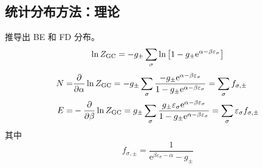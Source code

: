 \subsection{统计分布方法：理论}

\begin{framed}
    推导出 BE 和 FD 分布。\[
        \ln{Z_{\text{GC}}} = - g_{\pm} \sum_{\sigma} \ln \qty[1 - g_{\pm} \mathrm{e}^{\alpha - \beta \varepsilon_{\sigma}}]
    \] \begin{align*}
        N = & \pdv{\alpha} \ln{Z_{\text{GC}}} = - g_{\pm} \sum_{\sigma} \frac{- g_{\pm} \mathrm{e}^{\alpha - \beta \varepsilon_{\sigma}}}{1 - g_{\pm} \mathrm{e}^{\alpha - \beta \varepsilon_{\sigma}}} = \sum_{\sigma} f_{\sigma, \pm}                                        \\
        E = & - \pdv{\beta} \ln{Z_{\text{GC}}} = g_{\pm} \sum_{\sigma} \frac{g_{\pm} \varepsilon_{\sigma} \mathrm{e}^{\alpha - \beta \varepsilon_{\sigma}}}{1 - g_{\pm} \mathrm{e}^{\alpha - \beta \varepsilon_{\sigma}}} = \sum_{\sigma} \varepsilon_{\sigma} f_{\sigma, \pm}
    \end{align*} 其中 \[
        f_{\sigma, \pm} = \frac{1}{\mathrm{e}^{\beta \varepsilon_{\sigma} - \alpha} - g_{\pm} }
    \]
\end{framed}

